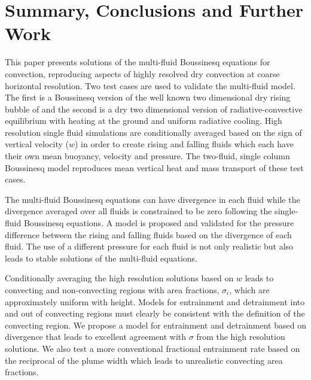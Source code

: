 \documentclass[draft]{agujournal2019}
\begin{document}
\section{Summary, Conclusions and Further Work}

This paper presents solutions of the multi-fluid Boussinesq equations
for convection, reproducing aspects of highly resolved dry convection
at coarse horizontal resolution. Two test cases are used to validate
the multi-fluid model. The first is a Boussinesq version of the well
known two dimensional dry rising bubble of  and the second
is a dry two dimensional version of radiative-convective equilibrium
with heating at the ground and uniform radiative cooling. High resolution
single fluid simulations are conditionally averaged based on the sign
of vertical velocity ($w$) in order to create rising and falling
fluids which each have their own mean buoyancy, velocity and pressure.
The two-fluid, single column Boussinesq model reproduces mean vertical
heat and mass transport of these test cases. 

The multi-fluid Boussinesq equations can have divergence in each fluid
while the divergence averaged over all fluids is 
{constrained to be zero following the single-fluid Boussinesq equations.}
A model is proposed and validated for the pressure difference between the rising
and falling fluids based on the divergence of each fluid. The use
of a different pressure for each fluid is not only realistic but also
leads to stable solutions of the multi-fluid equations. 

Conditionally averaging the high resolution solutions based on $w$
leads to convecting and non-convecting regions with area fractions,
$\sigma_{i}$, which are approximately uniform with height. Models
for entrainment and detrainment into and out of convecting regions
must clearly be consistent with the definition of the convecting region.
We propose a model for entrainment and detrainment based on divergence
that leads to excellent agreement with $\sigma$ from the high resolution
solutions. We also test a more conventional fractional entrainment
rate based on the reciprocal of the plume width which leads to unrealistic
convecting area fractions. 
\end{document}
